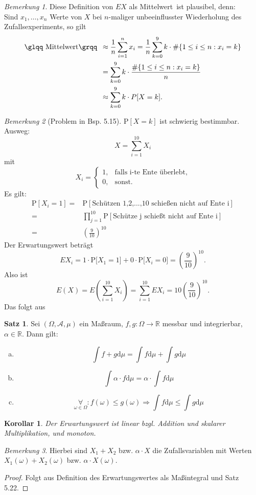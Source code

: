 \documentclass[a4paper,12pt,fleqn]{scrartcl}
\newcommand{\R}{\mathbb{R}}
\newcommand{\m}[1]{\mathcal{ #1 }}
\newcommand{\pe}[1]{\text{P[} #1 \text{]}}
\newcommand{\ZE}{Zufallsexperiment}
\newcommand{\ZV}{Zufallsvariable}
\newcommand{\impl}{\Rightarrow}
\newcommand{\fa}[1]{\mathop{\forall}\limits_{#1}}
\theoremstyle{definition}
\newtheorem{satz}[definition]{Satz}
\theoremstyle{plain}
\newtheorem{korollar}[definition]{Korollar}
\theoremstyle{remark}
\newtheorem*{bemerkung}{Bemerkung}
\begin{document}
\begin{bemerkung}
Diese Definition von $EX$ als \glqq Mittelwert\grqq \, ist plausibel, denn: \\
Sind $x_1, \ldots , x_n$ Werte von $X$ bei $n$-maliger unbeeinflusster Wiederholung des \ZE s, so gilt
\begin{align*}
\text{\glqq Mittelwert\grqq \,} &\approx \frac{1}{n} \sum_{i=1}^n x_i = \frac{1}{n} \sum_{k=0}^9 k \cdot \# \{1 \leq i \leq n : x_i = k\} \\
&= \sum_{k=0}^9 k \cdot \frac{\# \{1 \leq i \leq n : x_i = k\}}{n} \\
&\approx \sum_{k=0}^9 k \cdot P[X=k].
\end{align*}
\end{bemerkung}

\begin{bemerkung}[Problem in Bsp. 5.15]
$\mathrm{P}[X=k]$ ist schwierig bestimmbar. Ausweg:
\[X=\sum_{i=1}^{10}X_i\]
mit
\[X_i=\begin{cases}1,&\text{falls i-te Ente überlebt,}\\0,&\text{sonst.}
\end{cases}
\]
Es gilt:
\begin{align*}
\text{P}[X_i=1]=&\text{P}[\text{Schützen 1,2,...,10 schießen nicht auf Ente i}]\\
=&\prod_{j=1}^{10}\text{P}[\text{Schütze j schießt nicht auf Ente i}]\\
=&(\frac{9}{10})^{10}
\end{align*}
Der Erwartungswert beträgt
\[EX_i=1\cdot \pe{ X_1=1}+0\cdot \pe{ X_i=0}=(\frac{9}{10})^{10}.\]
Also ist
\[E(X)=E(\sum_{i=1}^{10}X_i)=\sum_{i=1}^{10}EX_i=10(\frac{9}{10})^{10}.\]
Das folgt aus
\end{bemerkung}
\begin{satz}
Sei $(\Omega,\m{A},\mu)$ ein Maßraum, $f,g:\Omega\to\R$ messbar und integrierbar, $\alpha\in\R$. Dann gilt:
\begin{enumerate}[a)]
\item \[\int f+g\mathrm{d}\mu =\int f\mathrm{d}\mu +\int g\mathrm{d}\mu\]
\item \[\int \alpha\cdot f\mathrm{d}\mu=\alpha\cdot\int f\mathrm{d}\mu\]
\item \[\fa{\omega\in\Omega}:f(\omega)\leq g(\omega)\impl\int f\mathrm{d}\mu\leq\int g\mathrm{d}\mu\]
\end{enumerate}
\end{satz}
\begin{korollar}
Der Erwartungswert ist linear bzgl. Addition und skalarer Multiplikation, und monoton.
\end{korollar}
\begin{bemerkung}
Hierbei sind $X_1+X_2$ bzw. $\alpha\cdot X$ die \ZV n mit Werten $X_1(\omega)+X_2(\omega)$ bzw. $\alpha\cdot X(\omega)$. 
\end{bemerkung}
\begin{proof}
Folgt aus Definition des Erwartungswertes als Maßintegral und Satz 5.22.
\end{proof}
\end{document}
